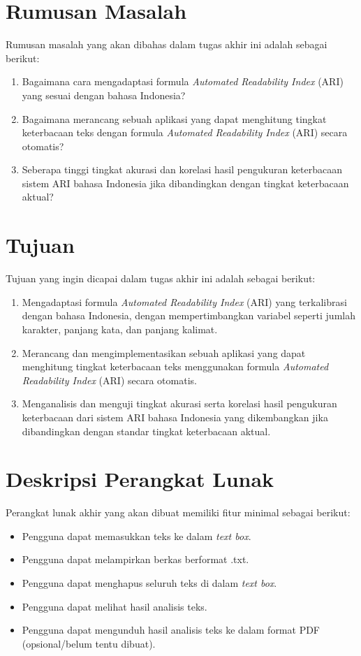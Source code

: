 \documentclass[a4paper,twoside]{article}
\begin{document}
\section{Rumusan Masalah}
Rumusan masalah yang akan dibahas dalam tugas akhir ini adalah sebagai berikut:
\begin{enumerate}
    \item Bagaimana cara mengadaptasi formula \textit{Automated Readability Index} (ARI) yang sesuai dengan bahasa Indonesia?
    \item Bagaimana merancang sebuah aplikasi yang dapat menghitung tingkat keterbacaan teks dengan formula \textit{Automated Readability Index} (ARI) secara otomatis?
    \item Seberapa tinggi tingkat akurasi dan korelasi hasil pengukuran keterbacaan sistem ARI bahasa Indonesia jika dibandingkan dengan tingkat keterbacaan aktual?
\end{enumerate}

\section{Tujuan}
Tujuan yang ingin dicapai dalam tugas akhir ini adalah sebagai berikut:
\begin{enumerate}
    \item Mengadaptasi formula \textit{Automated Readability Index} (ARI) yang terkalibrasi dengan bahasa Indonesia, dengan mempertimbangkan variabel seperti jumlah karakter, panjang kata, dan panjang kalimat.
    \item Merancang dan mengimplementasikan sebuah aplikasi yang dapat menghitung tingkat keterbacaan teks menggunakan formula \textit{Automated Readability Index} (ARI) secara otomatis.
    \item Menganalisis dan menguji tingkat akurasi serta korelasi hasil pengukuran keterbacaan dari sistem ARI bahasa Indonesia yang dikembangkan jika dibandingkan dengan standar tingkat keterbacaan aktual.
\end{enumerate}

\section{Deskripsi Perangkat Lunak}
Perangkat lunak akhir yang akan dibuat memiliki fitur minimal sebagai berikut:
\begin{itemize}
    \item Pengguna dapat memasukkan teks ke dalam \textit{text box}.
    \item Pengguna dapat melampirkan berkas berformat .txt.
    \item Pengguna dapat menghapus seluruh teks di dalam \textit{text box}.
    \item Pengguna dapat melihat hasil analisis teks.
    \item Pengguna dapat mengunduh hasil analisis teks ke dalam format PDF (opsional/belum tentu dibuat).
\end{itemize}
\end{document}
